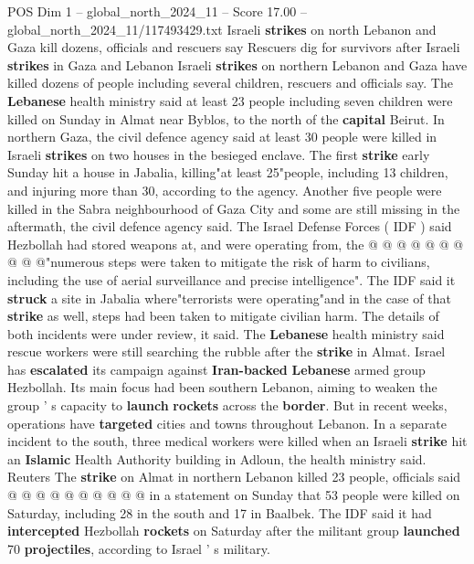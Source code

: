 \begin{textsample}{POS Dim 1 – global\_north\_2024\_11 – Score 17.00 – global\_north\_2024\_11/117493429.txt}  \label{ex:f1_pos_240}
Israeli \textbf{strikes} on north Lebanon and Gaza kill dozens, officials and rescuers say Rescuers dig for survivors after Israeli \textbf{strikes} in Gaza and Lebanon Israeli \textbf{strikes} on northern Lebanon and Gaza have killed dozens of people including several children, rescuers and officials say.
The \textbf{Lebanese} health ministry said at least 23 people including seven children were killed on Sunday in Almat near Byblos, to the north of the \textbf{capital} Beirut.
In northern Gaza, the civil defence agency said at least 30 people were killed in Israeli \textbf{strikes} on two houses in the besieged enclave.
The first \textbf{strike} early Sunday hit a house in Jabalia, killing"at least 25"people, including 13 children, and injuring more than 30, according to the agency.
Another five people were killed in the Sabra neighbourhood of Gaza City and some are still missing in the aftermath, the civil defence agency said.
The Israel Defense Forces ( IDF ) said Hezbollah had stored weapons at, and were operating from, the @ @ @ @ @ @ @ @ @ @"numerous steps were taken to mitigate the risk of harm to civilians, including the use of aerial surveillance and precise intelligence".
The IDF said it \textbf{struck} a site in Jabalia where"terrorists were operating"and in the case of that \textbf{strike} as well, steps had been taken to mitigate civilian harm.
The details of both incidents were under review, it said.
The \textbf{Lebanese} health ministry said rescue workers were still searching the rubble after the \textbf{strike} in Almat.
Israel has \textbf{escalated} its campaign against \textbf{Iran-backed} \textbf{Lebanese} armed group Hezbollah.
Its main focus had been southern Lebanon, aiming to weaken the group ' s capacity to \textbf{launch} \textbf{rockets} across the \textbf{border}.
But in recent weeks, operations have \textbf{targeted} cities and towns throughout Lebanon.
In a separate incident to the south, three medical workers were killed when an Israeli \textbf{strike} hit an \textbf{Islamic} Health Authority building in Adloun, the health ministry said.
Reuters The \textbf{strike} on Almat in northern Lebanon killed 23 people, officials said @ @ @ @ @ @ @ @ @ @ in a statement on Sunday that 53 people were killed on Saturday, including 28 in the south and 17 in Baalbek.
The IDF said it had \textbf{intercepted} Hezbollah \textbf{rockets} on Saturday after the militant group \textbf{launched} 70 \textbf{projectiles}, according to Israel ' s military.

\end{textsample}
